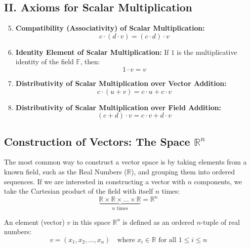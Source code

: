 \documentclass[11pt, a4paper]{article}
\begin{document}
	\subsection*{II. Axioms for Scalar Multiplication}
	\begin{enumerate}
		\setcounter{enumi}{4} %
		\item \textbf{Compatibility (Associativity) of Scalar Multiplication:} 
		\[ c \cdot (d \cdot v) = (c \cdot d) \cdot v \]
		
		\item \textbf{Identity Element of Scalar Multiplication:} If $1$ is the multiplicative identity of the field $\mathbb{F}$, then:
		\[ 1 \cdot v = v \]
		
		\item \textbf{Distributivity of Scalar Multiplication over Vector Addition:} 
		\[ c \cdot (u + v) = c \cdot u + c \cdot v \]
		
		\item \textbf{Distributivity of Scalar Multiplication over Field Addition:} 
		\[ (c + d) \cdot v = c \cdot v + d \cdot v \]
	\end{enumerate}
	
	\subsection*{Construction of Vectors: The Space $\mathbb{R}^n$}
	The most common way to construct a vector space is by taking elements from a known field, such as the Real Numbers ($\mathbb{R}$), and grouping them into ordered sequences. If we are interested in constructing a vector with $n$ components, we take the Cartesian product of the field with itself $n$ times:
	\[
	\underbrace{\mathbb{R} \times \mathbb{R} \times \dots \times \mathbb{R}}_{n \text{ times}} = \mathbb{R}^n
	\]
	
	An element (vector) $v$ in this space $\mathbb{R}^n$ is defined as an ordered $n$-tuple of real numbers:
	\[
	v = (x_1, x_2, \dots, x_n) \quad \text{where } x_i \in \mathbb{R} \text{ for all } 1 \le i \le n
	\]
	\vspace{-1em} %
	
\end{document}
